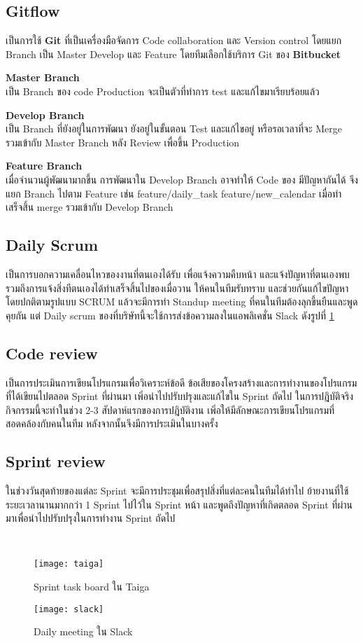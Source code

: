 \subsection{Gitflow}
เป็นการใช้ \textbf{Git} ที่เป็นเครื่องมือจัดการ Code collaboration และ Version control โดยแยก Branch เป็น Master Develop และ Feature โดยทีมเลือกใช้บริการ Git ของ \textbf{Bitbucket}

\textbf{Master Branch}\\
เป็น Branch ของ code Production จะเป็นตัวที่ทำการ test และแก้ไขมาเรียบร้อยแล้ว

\textbf{Develop Branch} \\
เป็น Branch ที่ยังอยู่ในการพัฒนา ยังอยู่ในขั้นตอน Test และแก้ไขอยู่ หรือรอเวลาที่จะ Merge รวมเข้ากับ Master Branch หลัง Review เพื่อขึ้น Production

\textbf{Feature Branch}\\
เมื่อจำนวนผู้พัฒนามากขึ้น การพัฒนาใน Develop Branch อาจทำให้ Code ของ มีปัญหากันได้ จึงแยก Branch ไปตาม Feature เช่น feature/daily\_task feature/new\_calendar เมื่อทำเสร็จสิ้น merge รวมเข้ากับ Develop Branch



\subsection{Daily Scrum}
เป็นการบอกความเคลื่อนไหวของงานที่ตนเองได้รับ เพื่อแจ้งความคืบหน้า และแจ้งปัญหาที่ตนเองพบรวมถึงการแจ้งสิ่งทีตนเองได้ทำเสร็จสิ้นไปของเมื่อวาน ให้คนในทีมรับทราบ และช่วยกันแก้ไขปัญหา โดยปกติตามรูปแบบ SCRUM แล้วจะมีการทำ Standup meeting ที่คนในทีมต้องลุกขึ้นยืนและพูดคุยกัน แต่ Daily scrum ของที่บริษัทนี้จะใช้การส่งข้อความลงในแอพลิเคชั่น Slack ดังรูปที่ \ref{Fig:slack}

\subsection{Code review}
เป็นการประเมินการเขียนโปรแกรมเพื่อวิเคราะห์ข้อดี ข้อเสียของโครงสร้างและการทำงานของโปรแกรมที่ได้เขียนไปตลอด Sprint ที่ผ่านมา เพิ่อนำไปปรับปรุงและแก้ไขใน Sprint ถัดไป ในการปฎิบัติจริงกิจกรรมนี้จะทำในช่วง 2-3 สัปดาห์แรกของการปฎิบัติงาน เพิ่อให้มีลักษณะการเขียนโปรแกรมที่สอดคล้องกับคนในทีม หลังจากนั้นจึงมีการประเมินในบางครั้ง

\subsection{Sprint review}
ในช่วงวันสุดท้ายของแต่ละ Sprint จะมีการประชุมเพื่อสรุปสิ่งที่แต่ละคนในทีมได้ทำไป ย้ายงานที่ใช้ระยะเวลานานมากกว่า 1 Sprint ไปไว้ใน Sprint หน้า และพูดถึงปัญหาที่เกิดตลอด Sprint ที่ผ่านมาเพื่อนำไปปรับปรุงในการทำงาน Sprint ถัดไป

\
\begin{figure}[!h]
	\centering
	\texttt{[image: taiga]}
	\caption{Sprint task board ใน Taiga}
	\label{Fig:taiga}
	\centering
	\texttt{[image: slack]}
	\caption{Daily meeting ใน Slack}
	\label{Fig:slack}
\end{figure}